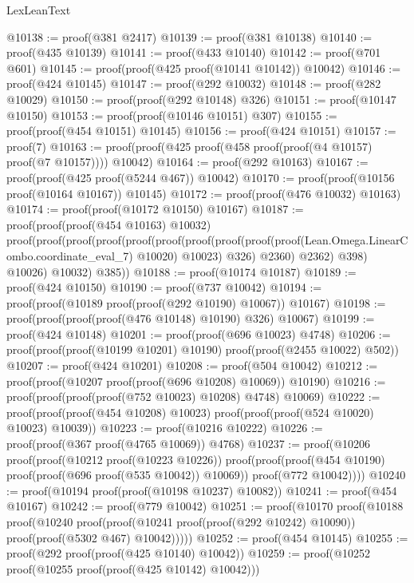 \begin{lexlean}{LexLeanText}
\begin{coremodule}
@10138 := proof(@381 @2417)
@10139 := proof(@381 @10138)
@10140 := proof(@435 @10139)
@10141 := proof(@433 @10140)
@10142 := proof(@701 @601)
@10145 := proof(proof(@425 proof(@10141 @10142)) @10042)
@10146 := proof(@424 @10145)
@10147 := proof(@292 @10032)
@10148 := proof(@282 @10029)
@10150 := proof(proof(@292 @10148) @326)
@10151 := proof(@10147 @10150)
@10153 := proof(proof(@10146 @10151) @307)
@10155 := proof(proof(@454 @10151) @10145)
@10156 := proof(@424 @10151)
@10157 := proof(7)
@10163 := proof(proof(@425 proof(@458 proof(proof(@4 @10157) proof(@7 @10157)))) @10042)
@10164 := proof(@292 @10163)
@10167 := proof(proof(@425 proof(@5244 @467)) @10042)
@10170 := proof(proof(@10156 proof(@10164 @10167)) @10145)
@10172 := proof(proof(@476 @10032) @10163)
@10174 := proof(proof(@10172 @10150) @10167)
@10187 := proof(proof(proof(@454 @10163) @10032)
      proof(proof(proof(proof(proof(proof(proof(proof(proof(proof(Lean.Omega.LinearCombo.coordinate_eval_7)
                          @10020)
                        @10023)
                      @326)
                    @2360)
                  @2362)
                @398)
              @10026)
            @10032)
          @385))
@10188 := proof(@10174 @10187)
@10189 := proof(@424 @10150)
@10190 := proof(@737 @10042)
@10194 := proof(proof(@10189 proof(proof(@292 @10190) @10067)) @10167)
@10198 := proof(proof(proof(proof(@476 @10148) @10190) @326) @10067)
@10199 := proof(@424 @10148)
@10201 := proof(proof(@696 @10023) @4748)
@10206 := proof(proof(proof(@10199 @10201) @10190) proof(proof(@2455 @10022) @502))
@10207 := proof(@424 @10201)
@10208 := proof(@504 @10042)
@10212 := proof(proof(@10207 proof(proof(@696 @10208) @10069)) @10190)
@10216 := proof(proof(proof(proof(@752 @10023) @10208) @4748) @10069)
@10222 := proof(proof(proof(@454 @10208) @10023) proof(proof(proof(@524 @10020) @10023) @10039))
@10223 := proof(@10216 @10222)
@10226 := proof(proof(@367 proof(@4765 @10069)) @4768)
@10237 := proof(@10206
      proof(proof(@10212 proof(@10223 @10226))
          proof(proof(proof(@454 @10190) proof(proof(@696 proof(@535 @10042)) @10069))
              proof(@772 @10042))))
@10240 := proof(@10194 proof(proof(@10198 @10237) @10082))
@10241 := proof(@454 @10167)
@10242 := proof(@779 @10042)
@10251 := proof(@10170
      proof(@10188
          proof(@10240
              proof(proof(@10241 proof(proof(@292 @10242) @10090))
                  proof(proof(@5302 @467) @10042)))))
@10252 := proof(@454 @10145)
@10255 := proof(@292 proof(proof(@425 @10140) @10042))
@10259 := proof(@10252 proof(@10255 proof(proof(@425 @10142) @10042)))

\end{coremodule}
\end{lexlean}
